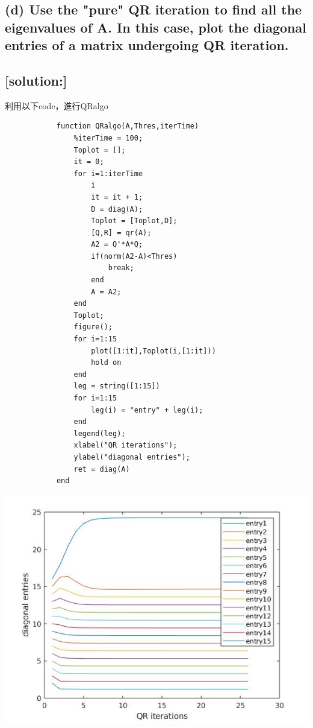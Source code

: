 \documentclass[12pt]{article}
\begin{document}
        \subsection*{(d) Use the "pure" QR iteration to find all the eigenvalues of A. In this case, plot
        the diagonal entries of a matrix undergoing QR iteration.}
        \subsection*{[solution:]}
        利用以下code，進行QRalgo
        \begin{lstlisting}
            function QRalgo(A,Thres,iterTime)
                %iterTime = 100;
                Toplot = [];
                it = 0;
                for i=1:iterTime
                    i
                    it = it + 1;
                    D = diag(A);
                    Toplot = [Toplot,D];
                    [Q,R] = qr(A);
                    A2 = Q'*A*Q;
                    if(norm(A2-A)<Thres)
                        break;
                    end
                    A = A2;
                end
                Toplot;
                figure();
                for i=1:15
                    plot([1:it],Toplot(i,[1:it]))
                    hold on
                end
                leg = string([1:15])
                for i=1:15
                    leg(i) = "entry" + leg(i);
                end
                legend(leg);
                xlabel("QR iterations");
                ylabel("diagonal entries");
                ret = diag(A)
            end
        \end{lstlisting}
        \includegraphics[scale=0.75]{entry.jpg}\\
\end{document}
